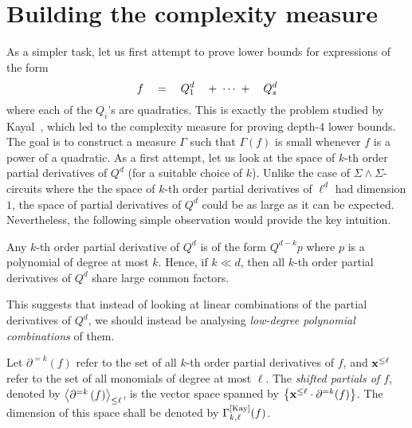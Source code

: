\section{Building the complexity measure}

As a simpler task, let us first attempt to prove lower bounds for expressions of the form
$$
f \quad = \quad Q_1^{d} \quad + \;\cdots\; +  \quad Q_s^{d}
$$
where each of the $Q_i$'s are quadratics. 
This is exactly the problem studied by Kayal~\cite{k2}, which led to the complexity measure for proving depth-$4$ lower bounds. \\

The goal is to construct a measure $\Gamma$ such that $\Gamma(f)$ is small whenever $f$ is a power of a quadratic. 
As a first attempt, let us look at the space of $k$-th order partial derivatives of $Q^d$ (for a suitable choice of $k$). 
Unlike the case of $\Sigma\!\wedge\!\Sigma$-circuits where the the space of $k$-th order partial derivatives of $\ell^d$ had dimension $1$, the space of partial derivatives of $Q^{d}$ could be as large as it can be expected. 
Nevertheless, the following simple observation would provide the key intuition.

\begin{observation} 
  Any $k$-th order partial derivative of $Q^d$ is of the form $Q^{d-k}p$ where $p$ is a polynomial of degree at most $k$. 
Hence, if $k \ll d$, then all $k$-th order partial derivatives of $Q^d$ share large common factors.
\end{observation}

This suggests that instead of looking at linear combinations of the partial derivatives of $Q^d$, we should instead be analysing \emph{low-degree polynomial combinations} of them. 
\begin{definition}\label{defn:shifted-partials}
  Let $\partial^{=k}(f)$ refer to the set of all $k$-th order partial derivatives of $f$, and $\mathbf{x}^{\leq \ell}$ refer to the set of all monomials of degree at most $\ell$. 
The \emph{shifted partials of $f$}, denoted by $\left\langle\partial^{=k}\left(f\right)\right\rangle_{\leq \ell}$, is the vector space spanned by $\left\{\mathbf{x}^{\leq \ell} \cdot \partial^{=k}(f)\right\}$. 
The dimension of this space shall be denoted by $\Gamma^{\mathrm{[Kay]}}_{k,\ell}(f)$. 
\end{definition}

